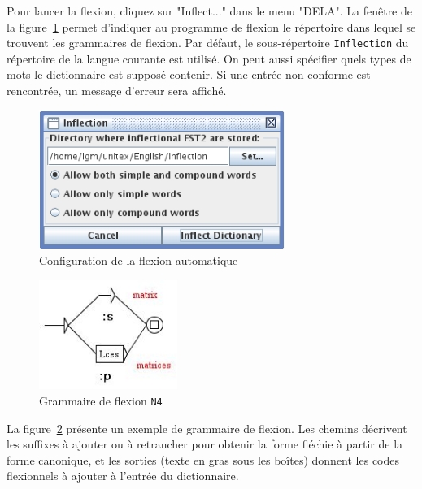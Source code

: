 \bigskip
\noindent Pour lancer la flexion, cliquez sur "Inflect..." dans le menu "DELA". La fenêtre de la 
figure~\ref{fig-inflection-configuration} permet d’indiquer au programme de flexion le
répertoire dans lequel se trouvent les grammaires de flexion. Par défaut, le sous-répertoire
\verb+Inflection+ du répertoire de la langue courante est utilisé. On peut aussi spécifier quels
types de mots le dictionnaire est supposé contenir. Si une entrée non conforme est
rencontrée, un message d'erreur sera affiché.

\bigskip
\begin{figure}[h]
\begin{center}
\includegraphics[width=8cm]{resources/img/fig3-7.png}
\caption{Configuration de la flexion automatique\label{fig-inflection-configuration}}
\end{center}
\end{figure}

\bigskip
\begin{figure}[h]
\begin{center}
\includegraphics[width=4.5cm]{resources/img/fig3-8.png}
\caption{Grammaire de flexion
\texttt{N4}\label{fig-example-inflectional-grammar}}
\end{center}
\end{figure}

\bigskip
\noindent La figure~\ref{fig-example-inflectional-grammar} présente un exemple de grammaire de
flexion. Les chemins décrivent les suffixes à ajouter ou à retrancher pour obtenir la forme fléchie
à partir de la forme canonique, et les sorties (texte en gras sous les boîtes) donnent les codes
flexionnels à ajouter à l’entrée du dictionnaire.


